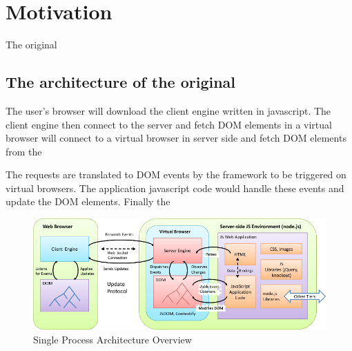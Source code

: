 \section{Motivation}
\label{sec:moti}
The original \cb{} 

\subsection{The architecture of the original \cb{}}
The user's browser will download the client engine written in javascript.
The client engine then connect to the server and fetch DOM elements in a
virtual browser
will connect to a virtual browser in server side and fetch DOM
elements from the 

The requests are translated to DOM events by the framework to be triggered on virtual browsers.
The application javascript code would handle these events and update the DOM elements.
Finally the 

\begin{figure}[h!]
\centering
\includegraphics[width=\textwidth]{figs/cb1_architecture_overview}
\caption{Single Process \cb{} Architecture Overview}
\label{fig:cb1arch}
\end{figure}
